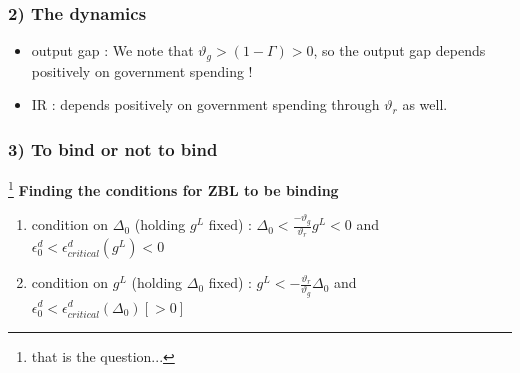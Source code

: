 \documentclass{article}
\begin{document}
\subsubsection{2) The dynamics}
\begin{itemize}
    \item output gap : We note that $\vartheta_g >(1-\Gamma)>0$, so the output gap depends positively on government spending !
    \item IR : depends positively on government spending through $\vartheta_r$ as well. 
\end{itemize}

\subsubsection{3) To bind or not to bind}\footnote{that is the question...}
\textbf{Finding the conditions for ZBL to be binding}
\begin{CondBox}
    \begin{enumerate}
        \item condition on $\Delta_0$ (holding $g^L$ fixed) : $\Delta_0 < \frac{-\vartheta_g}{\vartheta_r}g^L<0$ and $\epsilon_0^d<\epsilon_{critical}^d(g^L)<0$
        \item condition on $g^L$ (holding $\Delta_0$ fixed) : $g^L < -\frac{\vartheta_r}{\vartheta_g}\Delta_0$ and $\epsilon_0^d<\epsilon_{critical}^d(\Delta_0)[>0]$
    \end{enumerate}
\end{CondBox}
\end{document}
